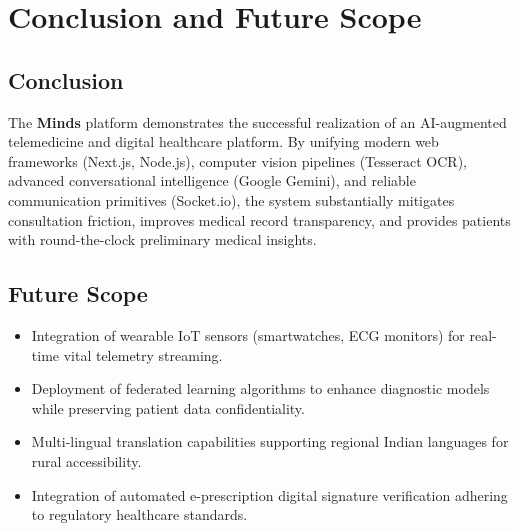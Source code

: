 \documentclass[12pt,a4paper]{report}
\begin{document}
\chapter{Conclusion and Future Scope}

\section{Conclusion}
The \textbf{Minds} platform demonstrates the successful realization of an AI-augmented telemedicine and digital healthcare platform. By unifying modern web frameworks (Next.js, Node.js), computer vision pipelines (Tesseract OCR), advanced conversational intelligence (Google Gemini), and reliable communication primitives (Socket.io), the system substantially mitigates consultation friction, improves medical record transparency, and provides patients with round-the-clock preliminary medical insights.

\section{Future Scope}
\begin{itemize}[leftmargin=1.5cm]
    \item Integration of wearable IoT sensors (smartwatches, ECG monitors) for real-time vital telemetry streaming.
    \item Deployment of federated learning algorithms to enhance diagnostic models while preserving patient data confidentiality.
    \item Multi-lingual translation capabilities supporting regional Indian languages for rural accessibility.
    \item Integration of automated e-prescription digital signature verification adhering to regulatory healthcare standards.
\end{itemize}
\end{document}
